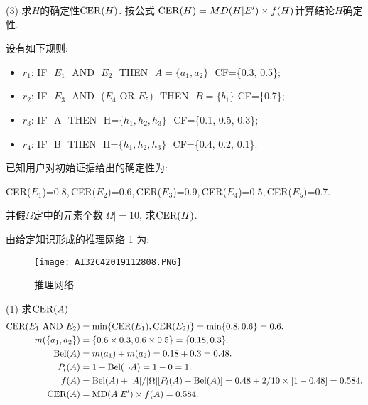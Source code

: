 (3) 求$H$的确定性$\textup{CER}(H)$. 按公式 $\textup{CER}(H)=MD(H|E') \times f(H)$计算结论$H$确定性.
\begin{example}
设有如下规则:
\begin{itemize}
    \item $r_1$:  IF\,\,  $E_1$\,\,  AND\,\,  $E_2$\,\,  THEN\,\,  $A=\{a_1, a_2\}$\,\,  \textup{CF}=\{0.3,  0.5\};
    \item $r_2$:  IF\,\,  $E_3$\,\,  AND\,\, ($E_4$  OR  $E_5$)\,\,  THEN\,\,  $B=\{b_1\}$  \textup{CF}=\{0.7\};
    \item $r_3$:  IF\,\,  A\,\,  THEN\,\,  H=$\{h_1, h_2, h_3\}$\,\,  \textup{CF}=\{0.1, 0.5, 0.3\};
    \item $r_4$:  IF\,\,  B\,\,  THEN\,\,  H=$\{h_1, h_2, h_3\}$\,\,  \textup{CF}=\{0.4, 0.2, 0.1\}.
\end{itemize}

已知用户对初始证据给出的确定性为:
\begin{center}
    \textup{CER}($E_1$)=0.8,\,\textup{CER}($E_2$)=0.6,\,\textup{CER}($E_3$)=0.9,\,\textup{CER}($E_4$)=0.5,\,\textup{CER}($E_5$)=0.7.
\end{center}
并假$\Omega$定中的元素个数$|\Omega|=10$, 求$\textup{CER}(H)$.
\end{example}
\begin{result}
    由给定知识形成的推理网络 \ref{AI32fig2808} 为:
\begin{figure}[H]
    \centering
    \texttt{[image: AI32C42019112808.PNG]}
    \caption{推理网络}
    \label{AI32fig2808}
\end{figure}
\end{result}

(1) 求$\textup{CER}(A)$
\begin{align*}
 \textup{CER}(E_1\,\, \textup{AND}\,\,  E_2)&=\min\{\textup{CER}(E_1), \textup{CER}(E_2)\}=\min\{0.8,  0.6\}=0.6.\\
   m(\{a_1, a_2\})&=\{0.6\times 0.3, 0.6\times 0.5\}=\{0.18, 0.3\}.\\
   \textup{Bel}(A)&=m({a_1})+m({a_2})=0.18+0.3=0.48.\\
   P_l(A)&=1-\textup{Bel}(\neg A)=1-0=1.\\
   f(A)&=\textup{Bel}(A)+|A|/|\Omega| [P_l(A)-\textup{Bel}(A)]=0.48+2/10\times [1-0.48] =0.584.\\
  \textup{CER}(A)&=\textup{MD}(A|E')\times f(A)=0.584.
\end{align*}

